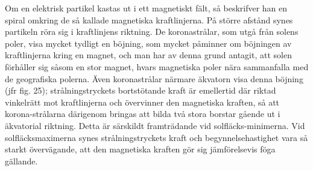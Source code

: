 \documentclass[a4paper, 12pt, oneside, swedish]{article}
\begin{document}
Om en elektrisk partikel kastas ut i ett magnetiskt fält, så beskrifver han en spiral omkring de så kallade magnetiska kraftlinjerna. På större afstånd synes partikeln röra sig i kraftlinjens riktning. De koronastrålar, som utgå från solens poler, visa mycket tydligt en böjning, som mycket påminner om böjningen av kraftlinjerna kring en magnet, och man har av denna grund antagit, att solen förhåller sig såsom en stor magnet, hvars magnetiska poler nära sammanfalla med de geografiska polerna. Även koronastrålar närmare äkvatorn visa denna böjning (jfr fig. 25); strålningstryckets bortstötande kraft är emellertid där riktad vinkelrätt mot kraftlinjerna och övervinner den magnetiska kraften, så att korona-strålarna därigenom bringas att bilda två stora borstar gående ut i äkvatorial riktning. Detta är särskildt framträdande vid solfläcks-minimerna. Vid solfläcksmaximerna synes strålningstryckets kraft och begynnelsehastighet vara så starkt övervägande, att den magnetiska kraften gör sig jämförelsevis föga gällande.
\end{document}
